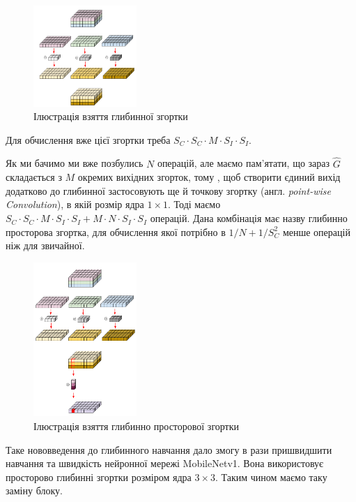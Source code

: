 \begin{figure}[H]
    \centering
    \includegraphics[width=0.35\textwidth]{images/cnn_deep_wise_conv}
    \caption{Ілюстрація взяття глибинної згортки  \cite{deep_wise_sep_conv_website}
        \label{fig:cnn:deep_wise_conv}
    }
\end{figure}

Для обчислення вже цієї згортки треба  $S_C · S_C · M · S_I · S_I$.

Як ми бачимо ми вже позбулись $N$ операцій, але маємо пам'ятати, що
зараз $\widehat{G}$ складається з $M$ окремих вихідних згорток, тому
, щоб створити єдиний вихід додатково до глибинної застосовують ще
й точкову згортку (англ. \textit{point-wise Convolution}), в якій розмір
ядра $1 \times 1$. Тоді маємо
$S_C · S_C · M · S_I · S_I + M · N · S_I · S_I$ операцій.
Дана комбінація має назву глибинно просторова згортка, для
обчислення якої потрібно в $1/N + 1/S_C^2$ менше операцій ніж
для звичайної.

\begin{figure}[H]
    \centering
    \includegraphics[width=0.35\textwidth]{images/cnn_deep_wise_separable_conv}
    \caption{Ілюстрація взяття глибинно просторової згортки  \cite{deep_wise_sep_conv_website}
        \label{fig:cnn:deep_wise_sep_conv}
    }
\end{figure}


Таке нововведення до глибинного навчання дало змогу в рази пришвидшити
навчання та швидкість нейронної мережі MobileNetv1. Вона використовує
просторово глибинні згортки розміром ядра $3 \times 3$.
Таким чином маємо таку заміну блоку.

